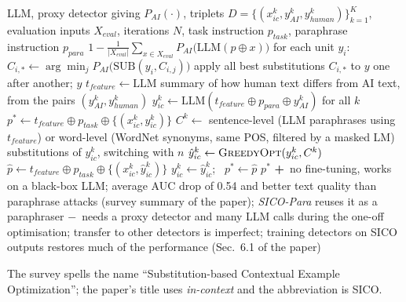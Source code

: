 \documentclass[10pt,a4paper,twocolumn]{article}
\newcommand{\pro}[1]{\Statex\textcolor{proc}{\textbf{+}\ #1}}
\newcommand{\con}[1]{\Statex\textcolor{conc}{\textbf{$-$}\ #1}}
\begin{document}
\begin{algorithm}[H]\small
\caption{SICO: substitution-based in-context example optimisation (Lu et al.\ 2024)}
\begin{algorithmic}[1]
\Require LLM, proxy detector giving $P_{AI}(\cdot)$, triplets $D=\{(x^k_{ic},y^k_{AI},y^k_{human})\}_{k=1}^K$, evaluation inputs $X_{eval}$, iterations $N$, task instruction $p_{task}$, paraphrase instruction $p_{para}$
 \State \Return $1-\frac1{|X_{eval}|}\sum_{x\in X_{eval}}P_{AI}\big(\mathrm{LLM}(p\oplus x)\big)$ \EndFunction
{} 
 \State for each unit $y_i$: $C_{i,*}\gets\arg\min_jP_{AI}\big(\mathrm{SUB}(y_i,C_{i,j})\big)$ 
 \State apply all best substitutions $C_{i,*}$ to $y$ one after another; \Return $y$
\EndFunction
{}
 \State $t_{feature}\gets\mathrm{LLM}$ summary of how human text differs from AI text, from the pairs $(y^k_{AI},y^k_{human})$
 \State $y^k_{ic}\gets\mathrm{LLM}(t_{feature}\oplus p_{para}\oplus y^k_{AI})$ for all $k$ 
 \State $p^*\gets t_{feature}\oplus p_{task}\oplus\{(x^k_{ic},y^k_{ic})\}$
   \State $C^k\gets$ sentence-level (LLM paraphrases using $t_{feature}$) or word-level (WordNet synonyms, same POS, filtered by a masked LM) substitutions of $y^k_{ic}$, switching with $n$
   \State $\hat y^k_{ic}\gets\textsc{GreedyOpt}(y^k_{ic},C^k)$
  \EndFor
  \State $\hat p\gets t_{feature}\oplus p_{task}\oplus\{(x^k_{ic},\hat y^k_{ic})\}$
   \State $y^k_{ic}\gets\hat y^k_{ic}$; \ $p^*\gets\hat p$ \EndIf
 \EndFor
 \State \Return $p^*$ 
\EndProcedure
\pro{no fine-tuning, works on a black-box LLM; average AUC drop of 0.54 and better text quality than paraphrase attacks (survey summary of the paper); \emph{SICO-Para} reuses it as a paraphraser}
\con{needs a proxy detector and many LLM calls during the one-off optimisation; transfer to other detectors is imperfect; training detectors on SICO outputs restores much of the performance (Sec.~6.1 of the paper)}
\end{algorithmic}
\end{algorithm}
The survey spells the name ``Substitution-based Contextual Example Optimization''; the paper's title uses \emph{in-context} and the abbreviation is SICO.
\end{document}

